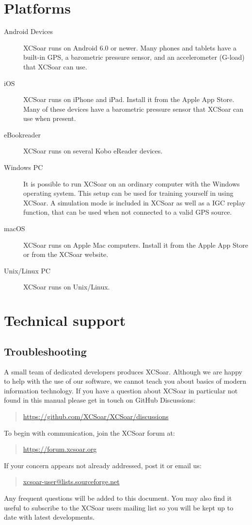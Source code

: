 \section{Platforms}
\begin{description}
\item[Android Devices]
XCSoar runs on Android 6.0 or newer.  Many phones and tablets have a
built-in GPS, a barometric pressure sensor, and an accelerometer
(G-load) that XCSoar can use.
\item[iOS]
XCSoar runs on iPhone and iPad. Install it from the Apple App Store.
Many of these devices have a barometric pressure sensor that XCSoar
can use when present.
\item [eBookreader]
XCSoar runs on several Kobo eReader devices.
\item[Windows PC]
It is possible to run XCSoar on an ordinary computer with the Windows
operating system. This setup can be used for training yourself in using XCSoar.
A simulation mode is included in XCSoar as well as a IGC replay function, that
can be used when not connected to a valid GPS source.
\item[macOS]
XCSoar runs on Apple Mac computers. Install it from the Apple App Store
or from the XCSoar website.
\item[Unix/Linux PC]
XCSoar runs on Unix/Linux.
\end{description}



\section{Technical support}

\subsection*{Troubleshooting}
A small team of dedicated developers produces XCSoar. Although we are
happy to help with the use of our software, we cannot teach you about
basics of modern information technology. If you have a question about XCSoar in
particular not found in this manual please get in touch on GitHub Discussions:
\begin{quote}
\url{https://github.com/XCSoar/XCSoar/discussions}
\end{quote}
To begin with communication, join the XCSoar forum at:
\begin{quote}
\url{https://forum.xcsoar.org}
\end{quote}
If your concern appears not already addressed, post it or email us: 
\begin{quote}
\href{mailto:xcsoar-user@lists.sourceforge.net}{xcsoar-user@lists.sourceforge.net}
\end{quote}
Any frequent questions will be added to this document.
You may also find it useful to subscribe to the XCSoar users mailing
list so you will be kept up to date with latest developments.

